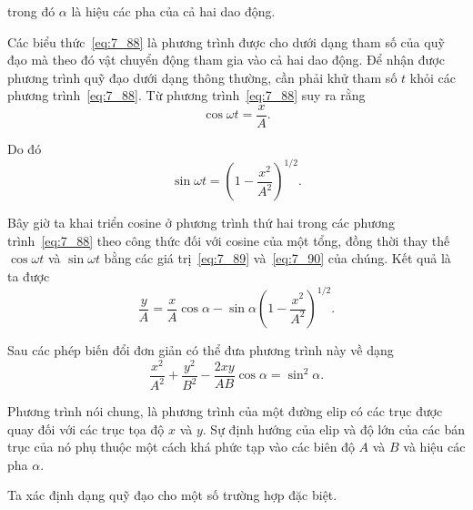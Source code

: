 \noindent
trong đó $\alpha$ là hiệu các pha của cả hai dao động.

Các biểu thức~\eqref{eq:7_88} là phương trình được cho dưới dạng tham số của quỹ đạo mà theo đó vật chuyển động tham gia vào cả hai dao động. Để nhận được phương trình quỹ đạo dưới dạng thông thường, cần phải khử tham số $t$ khỏi các phương trình~\eqref{eq:7_88}. Từ phương trình~\eqref{eq:7_88} suy ra rằng
\begin{equation}\label{eq:7_89}
	\cos\omega t = \frac{x}{A}.
\end{equation}

\noindent
Do đó
\begin{equation}\label{eq:7_90}
	\sin\omega t = \left(1 - \frac{x^2}{A^2}\right)^{1/2}.
\end{equation}

\noindent
Bây giờ ta khai triển cosine ở phương trình thứ hai trong các phương trình~\eqref{eq:7_88} theo công thức đối với cosine của một tổng, đồng thời thay thế $\cos\omega t$ và $\sin\omega t$ bằng các giá trị~\eqref{eq:7_89} và~\eqref{eq:7_90} của chúng. Kết quả là ta được
\begin{equation*}
	\frac{y}{A} = \frac{x}{A}\cos\alpha - \sin\alpha \left(1 - \frac{x^2}{A^2}\right)^{1/2}.
\end{equation*}

\noindent
Sau các phép biến đổi đơn giản có thể đưa phương trình này về dạng
\begin{equation}\label{eq:7_91}
	\frac{x^2}{A^2} + \frac{y^2}{B^2} - \frac{2xy}{AB} \cos\alpha = \sin^2\alpha.
\end{equation}

Phương trình  nói chung, là phương trình của một đường elip có các trục được quay đối với các trục tọa độ $x$ và $y$. Sự định hướng của elip và độ lớn của các bán trục của nó phụ thuộc một cách khá phức tạp vào các biên độ $A$ và $B$ và hiệu các pha $\alpha$.

Ta xác định dạng quỹ đạo cho một số trường hợp đặc biệt.

